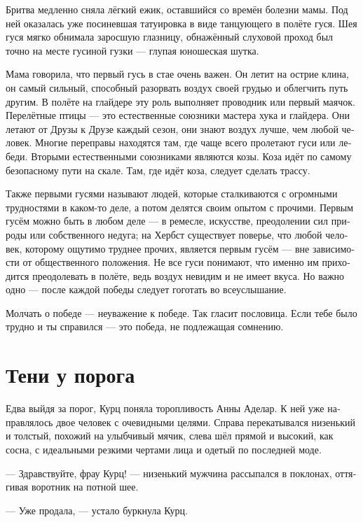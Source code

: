\documentclass[a4paper,12pt,fleqn]{book}\usepackage{polyglossia}\setdefaultlanguage[babelshorthands=true]{russian}\setotherlanguage{english}\defaultfontfeatures{Ligatures=TeX,Mapping=tex-text}\usepackage{xcolor}\newcommand{\ml}[3]{#2}
\begin{document}
Бритва медленно сняла лёгкий ежик, оставшийся со времён болезни мамы.
Под ней оказалась уже посиневшая татуировка в виде танцующего в полёте гуся.
Шея гуся мягко обнимала заросшую глазницу, обнажённый слуховой проход был точно на месте гусиной гузки --- глупая юношеская шутка.

Мама говорила, что первый гусь в стае очень важен.
Он летит на острие клина, он самый сильный, способный разорвать воздух своей грудью и облегчить путь другим.
В полёте на глайдере эту роль выполняет проводник или первый маячок.
Перелётные птицы --- это естественные союзники мастера хука и глайдера.
Они летают от Друзы к Друзе каждый сезон, они знают воздух лучше, чем любой человек.
Многие переправы находятся там, где чаще всего пролетают гуси или лебеди.
Вторыми естественными союзниками являются козы.
Коза идёт по самому безопасному пути на скале.
Там, где идёт коза, следует сделать трассу.

Также первыми гусями называют людей, которые сталкиваются с огромными трудностями в каком-то деле, а потом делятся своим опытом с прочими.
Первым гусём можно быть в любом деле --- в ремесле, искусстве, преодолении сил природы или собственного недуга;
на Хербст существует поверье, что любой человек, которому ощутимо труднее прочих, является первым гусём --- вне зависимости от общественного положения.
Не все гуси понимают, что именно им приходится преодолевать в полёте, ведь воздух невидим и не имеет вкуса.
Но важно одно --- после каждой победы следует гоготать во всеуслышание.

Молчать о победе --- неуважение к победе.
Так гласит пословица.
Если тебе было трудно и ты справился --- это победа, не подлежащая сомнению.

\section{Тени у порога}

Едва выйдя за порог, Курц поняла торопливость Анны Аделар.
К ней уже направлялось двое человек с очевидными целями.
Справа перекатывался низенький и толстый, похожий на улыбчивый мячик, слева шёл прямой и высокий, как сосна, с идеальными резкими чертами лица и одетый по последней моде.

--- Здравствуйте, фрау Курц! --- низенький мужчина рассыпался в поклонах, оттягивая воротник на потной шее.

\ml{$0$}
{--- Уже продала, --- устало буркнула Курц.}
{``Already sold,'' Kurz wearily grumped.}
\end{document}
